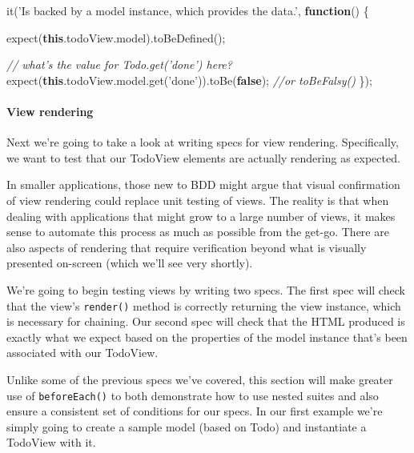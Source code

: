 \documentclass[9pt]{book}
\newenvironment{Shaded}{}{}
\newcommand{\KeywordTok}[1]{\textcolor[rgb]{0.00,0.44,0.13}{\textbf{{#1}}}}
\newcommand{\StringTok}[1]{\textcolor[rgb]{0.25,0.44,0.63}{{#1}}}
\newcommand{\CommentTok}[1]{\textcolor[rgb]{0.38,0.63,0.69}{\textit{{#1}}}}
\newcommand{\OtherTok}[1]{\textcolor[rgb]{0.00,0.44,0.13}{{#1}}}
\newcommand{\FunctionTok}[1]{\textcolor[rgb]{0.02,0.16,0.49}{{#1}}}
\newcommand{\NormalTok}[1]{{#1}}
\begin{document}
\begin{Shaded}
\begin{Highlighting}[]
\FunctionTok{it}\NormalTok{(}\StringTok{'Is backed by a model instance, which provides the data.'}\NormalTok{, }\KeywordTok{function}\NormalTok{() \{}

    \FunctionTok{expect}\NormalTok{(}\KeywordTok{this}\NormalTok{.}\OtherTok{todoView}\NormalTok{.}\FunctionTok{model}\NormalTok{).}\FunctionTok{toBeDefined}\NormalTok{();}

    \CommentTok{// what's the value for Todo.get('done') here?}
    \FunctionTok{expect}\NormalTok{(}\KeywordTok{this}\NormalTok{.}\OtherTok{todoView}\NormalTok{.}\OtherTok{model}\NormalTok{.}\FunctionTok{get}\NormalTok{(}\StringTok{'done'}\NormalTok{)).}\FunctionTok{toBe}\NormalTok{(}\KeywordTok{false}\NormalTok{); }\CommentTok{//or toBeFalsy()}
\NormalTok{\});}
\end{Highlighting}
\end{Shaded}

\paragraph{View rendering}\label{view-rendering}

Next we're going to take a look at writing specs for view rendering.
Specifically, we want to test that our TodoView elements are actually
rendering as expected.

In smaller applications, those new to BDD might argue that visual
confirmation of view rendering could replace unit testing of views. The
reality is that when dealing with applications that might grow to a
large number of views, it makes sense to automate this process as much
as possible from the get-go. There are also aspects of rendering that
require verification beyond what is visually presented on-screen (which
we'll see very shortly).

We're going to begin testing views by writing two specs. The first spec
will check that the view's \texttt{render()} method is correctly
returning the view instance, which is necessary for chaining. Our second
spec will check that the HTML produced is exactly what we expect based
on the properties of the model instance that's been associated with our
TodoView.

Unlike some of the previous specs we've covered, this section will make
greater use of \texttt{beforeEach()} to both demonstrate how to use
nested suites and also ensure a consistent set of conditions for our
specs. In our first example we're simply going to create a sample model
(based on Todo) and instantiate a TodoView with it.
\end{document}
